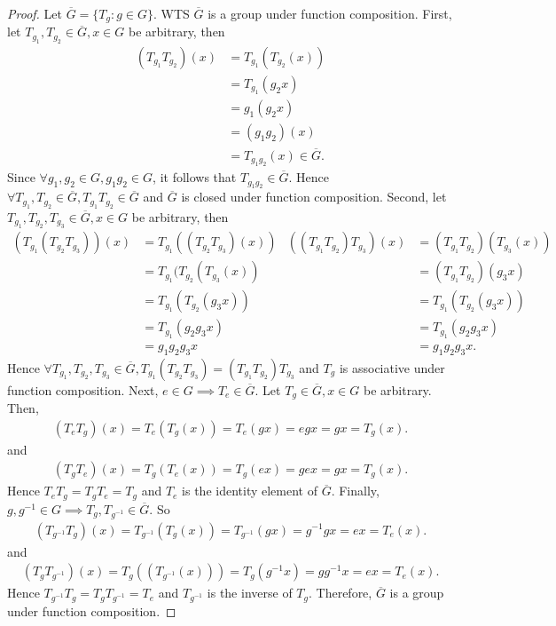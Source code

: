 \documentclass{article}
\theoremstyle{definition}
\begin{document}
\begin{proof}
     Let $\overline{G}=\{T_g: g \in G\}$. WTS $\overline{G}$ is a group under function composition. First, let $T_{g_1},T_{g_2} \in \overline{G}, x \in G$ be arbitrary, then
     \begin{align*}
         (T_{g_1}T_{g_2})(x) &= T_{g_1}(T_{g_2}(x)) \\
         &= T_{g_1}(g_2x) \\
         &= g_1(g_2x) \\
         &= (g_1g_2)(x) \\
         &= T_{g_1g_2}(x) \in \overline{G}.
     \end{align*}
     Since $\forall g_1, g_2 \in G, g_1g_2 \in G$, it follows that $T_{g_1g_2} \in \overline{G}$. Hence $\forall T_{g_1}, T_{g_2} \in \overline{G}, T_{g_1}T_{g_2} \in \overline{G}$ and $\overline{G}$ is closed under function composition. Second, let $T_{g_1},T_{g_2},T_{g_3} \in \overline{G}, x \in G$ be arbitrary, then
     \begin{align*}
         (T_{g_1}(T_{g_2}T_{g_3}))(x) &= T_{g_1}((T_{g_2}T_{g_3})(x))   & ((T_{g_1}T_{g_2})T_{g_3})(x) &= (T_{g_1}T_{g_2})(T_{g_3}(x)) \\
         &= T_{g_1}(T_{g_2}(T_{g_3}(x))                                 & &= (T_{g_1}T_{g_2})(g_3x) \\
         &= T_{g_1}(T_{g_2}(g_3x))                                      & &= T_{g_1}(T_{g_2}(g_3x))  \\
         &= T_{g_1}(g_2g_3x)                                            & &= T_{g_1}(g_2g_3x) \\
         &= g_1g_2g_3x                                                  & &= g_1g_2g_3x.
     \end{align*}
     Hence $\forall T_{g_1},T_{g_2},T_{g_3} \in \overline{G}, T_{g_1}(T_{g_2}T_{g_3}) = (T_{g_1}T_{g_2})T_{g_3}$ and $T_g$ is associative under function composition. Next, $e \in G \implies T_e \in \overline{G}$. Let $T_g \in \overline{G}, x \in G$ be arbitrary. Then,
     \begin{align*}
         (T_eT_g)(x) = T_e(T_g(x)) = T_e(gx) = egx = gx = T_g(x).
     \end{align*}
     and
     \begin{align*}
         (T_gT_e)(x) = T_g(T_e(x)) = T_g(ex) = gex = gx = T_g(x).
     \end{align*}
     Hence $T_eT_g = T_gT_e = T_g$ and $T_e$ is the identity element of $\overline{G}$. Finally, $g, g^{-1} \in G \implies T_g, T_{g^{-1}} \in \overline{G}$. So
     \begin{align*}
         (T_{g^{-1}}T_g)(x) = T_{g^{-1}}(T_g(x)) = T_{g^{-1}}(gx) = g^{-1}gx = ex = T_e(x).
     \end{align*}
     and
     \begin{align*}
         (T_gT_{g^{-1}})(x) = T_g((T_{g^{-1}}(x))) = T_g(g^{-1}x) = gg^{-1}x = ex = T_e(x).
     \end{align*}
     Hence $T_{g^{-1}}T_g = T_gT_{g^{-1}} = T_e$ and $T_{g^{-1}}$ is the inverse of $T_g$. Therefore, $\overline{G}$ is a group under function composition.
     

\end{proof}
\end{document}
